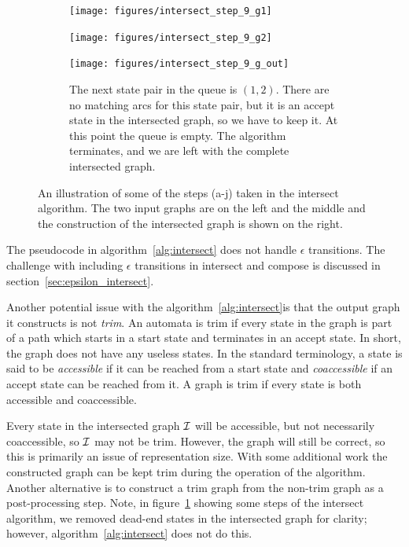 \begin{figure}\ContinuedFloat
    \begin{subfigure}{\linewidth}
        \begin{minipage}[b]{0.22\textwidth}
            \centering
            \texttt{[image: figures/intersect\_step\_9\_g1]}
        \end{minipage}
        \begin{minipage}[b]{0.37\textwidth}
            \centering
            \texttt{[image: figures/intersect\_step\_9\_g2]}
        \end{minipage}
        \begin{minipage}[b]{0.37\textwidth}
            \centering
            \texttt{[image: figures/intersect\_step\_9\_g\_out]}
        \end{minipage}
        \caption{The next state pair in the queue is $(1, 2)$. There are no
        matching arcs for this state pair, but it is an accept state in the
        intersected graph, so we have to keep it. At this point the queue is
        empty. The algorithm terminates, and we are left with the complete
        intersected graph.}
    \end{subfigure}
    \caption{An illustration of some of the steps (a-j) taken in the intersect
    algorithm. The two input graphs are on the left and the middle and the
    construction of the intersected graph is shown on the right.}
    \label{fig:intersect_steps}
\end{figure}

The pseudocode in algorithm~\ref{alg:intersect} does not handle $\epsilon$
transitions. The challenge with including $\epsilon$ transitions in intersect
and compose is discussed in section~\ref{sec:epsilon_intersect}.

Another potential issue with the algorithm~\ref{alg:intersect}is that the
output graph it constructs is not \emph{trim}. An automata is trim if every
state in the graph is part of a path which starts in a start state and
terminates in an accept state.  In short, the graph does not have any useless
states. In the standard terminology, a state is said to be \emph{accessible} if
it can be reached from a start state and \emph{coaccessible} if an accept state
can be reached from it. A graph is trim if every state is both accessible and
coaccessible.

Every state in the intersected graph $\mathcal{I}$ will be accessible, but not
necessarily coaccessible, so $\mathcal{I}$ may not be trim. However, the graph will
still be correct, so this is primarily an issue of representation size. With
some additional work the constructed graph can be kept trim during the
operation of the algorithm. Another alternative is to construct a trim graph
from the non-trim graph as a post-processing step. Note, in
figure~\ref{fig:intersect_steps} showing some steps of the intersect algorithm,
we removed dead-end states in the intersected graph for clarity; however,
algorithm~\ref{alg:intersect} does not do this.

